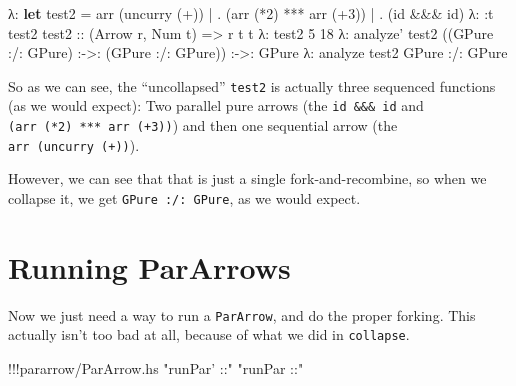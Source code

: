 \documentclass[]{article}
\newenvironment{Shaded}{}{}
\newcommand{\KeywordTok}[1]{\textcolor[rgb]{0.00,0.44,0.13}{\textbf{{#1}}}}
\newcommand{\DataTypeTok}[1]{\textcolor[rgb]{0.56,0.13,0.00}{{#1}}}
\newcommand{\DecValTok}[1]{\textcolor[rgb]{0.25,0.63,0.44}{{#1}}}
\newcommand{\StringTok}[1]{\textcolor[rgb]{0.25,0.44,0.63}{{#1}}}
\newcommand{\OtherTok}[1]{\textcolor[rgb]{0.00,0.44,0.13}{{#1}}}
\newcommand{\FunctionTok}[1]{\textcolor[rgb]{0.02,0.16,0.49}{{#1}}}
\newcommand{\NormalTok}[1]{{#1}}
\begin{document}
\begin{Shaded}
\begin{Highlighting}[]
\NormalTok{λ}\FunctionTok{:} \KeywordTok{let} \NormalTok{test2 }\FunctionTok{=} \NormalTok{arr (uncurry (}\FunctionTok{+}\NormalTok{))}
 \FunctionTok{|}           \FunctionTok{.} \NormalTok{(arr (}\FunctionTok{*}\DecValTok{2}\NormalTok{) }\FunctionTok{***} \NormalTok{arr (}\FunctionTok{+}\DecValTok{3}\NormalTok{))}
 \FunctionTok{|}           \FunctionTok{.} \NormalTok{(id }\FunctionTok{&&&} \NormalTok{id)}
\NormalTok{λ}\FunctionTok{:} \FunctionTok{:}\NormalTok{t test2}
\OtherTok{test2 ::} \NormalTok{(}\DataTypeTok{Arrow} \NormalTok{r, }\DataTypeTok{Num} \NormalTok{t) }\OtherTok{=>} \NormalTok{r t t}
\NormalTok{λ}\FunctionTok{:} \NormalTok{test2 }\DecValTok{5}
\DecValTok{18}
\NormalTok{λ}\FunctionTok{:} \NormalTok{analyze' test2}
\NormalTok{((}\DataTypeTok{GPure} \FunctionTok{:/:} \DataTypeTok{GPure}\NormalTok{) }\FunctionTok{:->:} \NormalTok{(}\DataTypeTok{GPure} \FunctionTok{:/:} \DataTypeTok{GPure}\NormalTok{)) }\FunctionTok{:->:} \DataTypeTok{GPure}
\NormalTok{λ}\FunctionTok{:} \NormalTok{analyze test2}
\DataTypeTok{GPure} \FunctionTok{:/:} \DataTypeTok{GPure}
\end{Highlighting}
\end{Shaded}

So as we can see, the ``uncollapsed'' \texttt{test2} is actually three
sequenced functions (as we would expect): Two parallel pure arrows (the
\texttt{id\ \&\&\&\ id} and \texttt{(arr\ (*2)\ ***\ arr\ (+3))}) and
then one sequential arrow (the \texttt{arr\ (uncurry\ (+))}).

However, we can see that that is just a single fork-and-recombine, so
when we collapse it, we get \texttt{GPure\ :/:\ GPure}, as we would
expect.

\section{Running ParArrows}\label{running-pararrows}

Now we just need a way to run a \texttt{ParArrow}, and do the proper
forking. This actually isn't too bad at all, because of what we did in
\texttt{collapse}.

\begin{Shaded}
\begin{Highlighting}[]
\FunctionTok{!!!}\NormalTok{pararrow}\FunctionTok{/}\NormalTok{ParArrow.hs }\StringTok{"runPar' ::"} \StringTok{"runPar ::"}
\end{Highlighting}
\end{Shaded}
\end{document}
